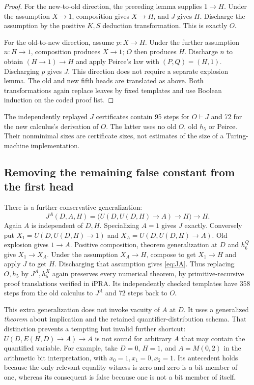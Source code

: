 \begin{proof}
For the new-to-old direction, the preceding lemma supplies $1\to H$.
Under the assumption $X\to1$, composition gives $X\to H$, and $J$ gives
$H$.  Discharge the assumption by the positive $K,S$ deduction
transformation.  This is exactly $O$.

For the old-to-new direction, assume $p:X\to H$.  Under the further
assumption $n:H\to1$, composition produces $X\to1$; $O$ then produces
$H$.  Discharge $n$ to obtain $(H\to1)\to H$ and apply Peirce's law
with $(P,Q)=(H,1)$.  Discharging $p$ gives $J$.  This direction does
not require a separate explosion lemma.  The old and new fifth heads
are translated as above.  Both transformations again replace leaves
by fixed templates and use Boolean induction on the coded proof list.
\end{proof}

The independently replayed $J$ certificates contain 95 steps for
$O\vdash J$ and 72 for the new calculus's derivation of $O$.  The latter
uses no old $O$, old $h_5$ or Peirce.  Their nonminimal sizes are
certificate sizes, not estimates of the size of a Turing-machine
implementation.

\subsection{Removing the remaining false constant from the first head}

There is a further conservative generalization:
\begin{equation}
 J^A(D,A,H)=\bigl(U(D,U(D,H)\to A)\to H\bigr)\to H.
 \label{eq:JA}
\end{equation}
Again $A$ is independent of $D,H$.  Specializing $A=1$ gives $J$ exactly.
Conversely put $X_1=U(D,U(D,H)\to1)$ and
$X_A=U(D,U(D,H)\to A)$.  Old explosion gives $1\to A$.
Positive composition, theorem generalization at $D$ and $h_6^Q$ give
$X_1\to X_A$.  Under the assumption $X_A\to H$, compose to get
$X_1\to H$ and apply $J$ to get $H$.  Discharging that assumption
gives \eqref{eq:JA}.  Thus replacing $O,h_5$ by $J^A,h_5^X$ again
preserves every numerical theorem, by primitive-recursive proof
translations verified in iPRA.  Its independently checked templates
have 358 steps from the old calculus to $J^A$ and 72 steps back to $O$.

This extra generalization does not invoke vacuity of $A$ at $D$.
It uses a generalized \emph{theorem} about implication and the retained
quantifier-distribution schema.  That distinction prevents a tempting
but invalid further shortcut: $U(D,E(H,D)\to A)\to A$ is not sound
for arbitrary $A$ that may contain the quantified variable.  For example,
take $D=0$, $H=1$, and $A=M(0,2)$ in the arithmetic bit interpretation,
with $x_0=1,x_1=0,x_2=1$.  Its antecedent holds because the only relevant
equality witness is zero and zero is a bit member of one, whereas its
consequent is false because one is not a bit member of itself.

